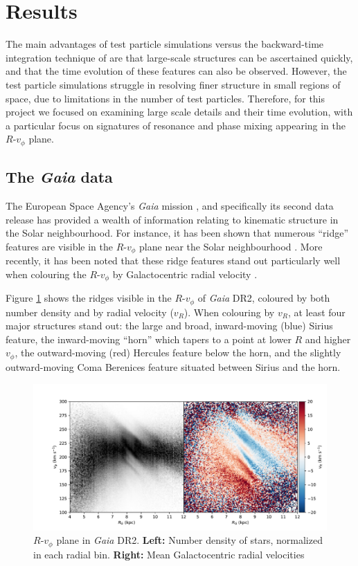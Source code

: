 \documentclass[10pt]{article}
\begin{document}
\section{Results} \label{results}
The main advantages of test particle simulations versus the backward-time integration technique of \textcite{D00} are that large-scale structures can be ascertained quickly, and that the time evolution of these features can also be observed. However, the test particle simulations struggle in resolving finer structure in small regions of space, due to limitations in the number of test particles. Therefore, for this project we focused on examining large scale details and their time evolution, with a particular focus on signatures of resonance and phase mixing appearing in the $R$-$v_\phi$ plane.

\subsection{The \textit{Gaia} data}
The European Space Agency's \textit{Gaia} mission \parencite{GaiaMission}, and specifically its second data release \parencite[DR2;][]{DR2} has provided a wealth of information relating to kinematic structure in the Solar neighbourhood. For instance, it has been shown that numerous ``ridge'' features are visible in the $R$-$v_\phi$ plane near the Solar neighbourhood \parencite{KBCCGHS18}. More recently, it has been noted that these ridge features stand out particularly well when colouring the $R$-$v_\phi$ by Galactocentric radial velocity \parencite{Fragkoudi+19}. 

Figure \ref{fig:gaia} shows the ridges visible in the $R$-$v_\phi$ of \textit{Gaia} DR2, coloured by both number density and by radial velocity ($v_R$). When colouring by $v_R$, at least four major structures stand out: the large and broad, inward-moving (blue) Sirius feature, the inward-moving ``horn'' which tapers to a point at lower $R$ and higher $v_\phi$, the outward-moving (red) Hercules feature below the horn, and the slightly outward-moving Coma  Berenices feature situated between Sirius and the horn.

\begin{figure}[h]
    \centering
    \includegraphics[width=\textwidth]{plots/gaia_RvT.pdf}
    \caption{$R$-$v_\phi$ plane in \textit{Gaia} DR2. \textbf{Left:} Number density of stars, normalized in each radial bin. \textbf{Right:} Mean Galactocentric radial velocities}
    \label{fig:gaia}
\end{figure}
\end{document}
